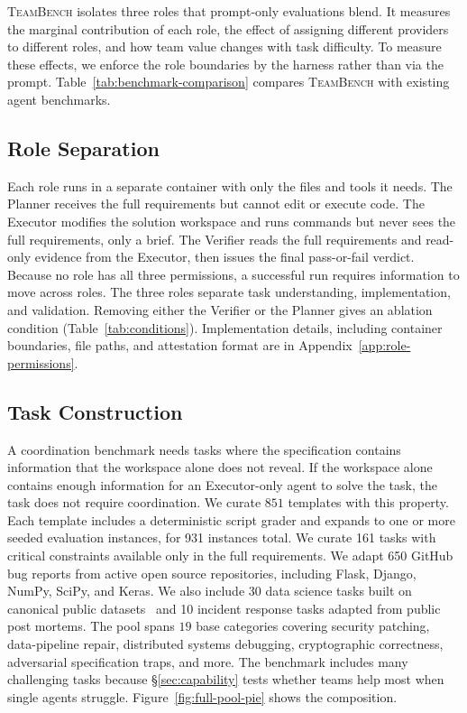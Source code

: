 \documentclass{article}
\begin{document}
\textsc{TeamBench} isolates three roles that prompt-only evaluations blend. It measures the marginal contribution of each role, the effect of assigning different providers to different roles, and how team value changes with task difficulty. To measure these effects, we enforce the role boundaries by the harness rather than via the prompt. Table~\ref{tab:benchmark-comparison} compares \textsc{TeamBench} with existing agent benchmarks.

\subsection{Role Separation}
\label{sec:roles}

Each role runs in a separate container with only the files and tools it needs. The Planner receives the full requirements but cannot edit or execute code. The Executor modifies the solution workspace and runs commands but never sees the full requirements, only a brief. The Verifier reads the full requirements and read-only evidence from the Executor, then issues the final pass-or-fail verdict. Because no role has all three permissions, a successful run requires information to move across roles. The three roles separate task understanding, implementation, and validation. Removing either the Verifier or the Planner gives an ablation condition (Table~\ref{tab:conditions}). Implementation details, including container boundaries, file paths, and attestation format are in Appendix~\ref{app:role-permissions}.

\subsection{Task Construction}
\label{sec:tasks}

A coordination benchmark needs tasks where the specification contains information that the workspace alone does not reveal. If the workspace alone contains enough information for an Executor-only agent to solve the task, the task does not require coordination. We curate $851$ templates with this property. Each template includes a deterministic script grader and expands to one or more seeded evaluation instances, for 931 instances total. We curate 161 tasks with critical constraints available only in the full requirements. We adapt 650 GitHub bug reports from active open source repositories, including Flask, Django, NumPy, SciPy, and Keras. We also include 30 data science tasks built on canonical public datasets~\citep{dua2019uci} and 10 incident response tasks adapted from public post mortems. The pool spans $19$ base categories covering security patching, data-pipeline repair, distributed systems debugging, cryptographic correctness, adversarial specification traps, and more. The benchmark includes many challenging tasks because \S\ref{sec:capability} tests whether teams help most when single agents struggle. Figure~\ref{fig:full-pool-pie} shows the composition.
\end{document}
